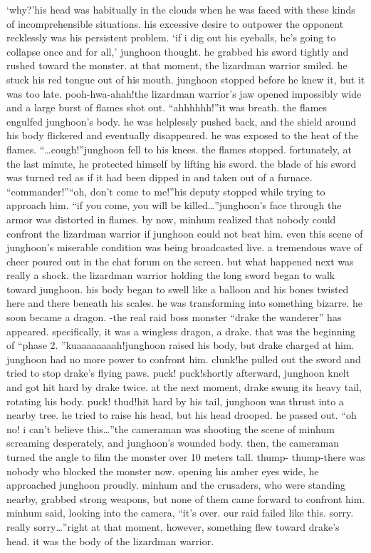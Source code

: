 ‘why?’his head was habitually in the clouds when he was faced with these kinds of incomprehensible situations.
 his excessive desire to outpower the opponent recklessly was his persistent problem.
‘if i dig out his eyeballs, he’s going to collapse once and for all,’ junghoon thought.
he grabbed his sword tightly and rushed toward the monster.
at that moment, the lizardman warrior smiled.
 he stuck his red tongue out of his mouth.
 junghoon stopped before he knew it, but it was too late.
pooh-hwa-ahah!the lizardman warrior’s jaw opened impossibly wide and a large burst of flames shot out.
“ahhhhhh!”it was breath.
 the flames engulfed junghoon’s body.
 he was helplessly pushed back, and the shield around his body flickered and eventually disappeared.
 he was exposed to the heat of the flames.
“…cough!”junghoon fell to his knees.
 the flames stopped.
 fortunately, at the last minute, he protected himself by lifting his sword.
 the blade of his sword was turned red as if it had been dipped in and taken out of a furnace.
“commander!”“oh, don’t come to me!”his deputy stopped while trying to approach him.
“if you come, you will be killed…”junghoon’s face through the armor was distorted in flames.
by now, minhum realized that nobody could confront the lizardman warrior if junghoon could not beat him.
even this scene of junghoon’s miserable condition was being broadcasted live.
a tremendous wave of cheer poured out in the chat forum on the screen.
but what happened next was really a shock.
the lizardman warrior holding the long sword began to walk toward junghoon.
 his body began to swell like a balloon and his bones twisted here and there beneath his scales.
 he was transforming into something bizarre.
 he soon became a dragon.
-the real raid boss monster “drake the wanderer” has appeared.
specifically, it was a wingless dragon, a drake.
that was the beginning of “phase 2.
”kuaaaaaaaah!junghoon raised his body, but drake charged at him.
 junghoon had no more power to confront him.
clunk!he pulled out the sword and tried to stop drake’s flying paws.
puck! puck!shortly afterward, junghoon knelt and got hit hard by drake twice.
 at the next moment, drake swung its heavy tail, rotating his body.
puck! thud!hit hard by his tail, junghoon was thrust into a nearby tree.
 he tried to raise his head, but his head drooped.
 he passed out.
“oh no! i can’t believe this…”the cameraman was shooting the scene of minhum screaming desperately, and junghoon’s wounded body.
 then, the cameraman turned the angle to film the monster over 10 meters tall.
thump- thump-there was nobody who blocked the monster now.
 opening his amber eyes wide, he approached junghoon proudly.
minhum and the crusaders, who were standing nearby, grabbed strong weapons, but none of them came forward to confront him.
minhum said, looking into the camera, “it’s over.
 our raid failed like this.
 sorry.
 really sorry…”right at that moment, however, something flew toward drake’s head.
 it was the body of the lizardman warrior.


